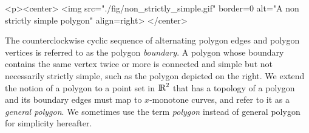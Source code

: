 \lcTex{%
  \setlength{\widthRight}{1.4cm}
  \setlength{\widthLeft}{\widthLineReal}
  \addtolength{\widthLeft}{-\widthRight}
  \begin{minipage}{\widthLeft}
}
\label{fig:non_strictly_simple_polygon}
\begin{ccHtmlOnly}
  <p><center>
    <img src="./fig/non_strictly_simple.gif" border=0 alt="A non strictly simple polygon" align=right>
  </center>
\end{ccHtmlOnly}
The counterclockwise cyclic sequence of alternating polygon edges and
polygon vertices is referred to as the polygon {\em boundary}.
A polygon whose boundary contains the same vertex twice or more is connected
and simple but not necessarily strictly simple, such as the polygon depicted
on the right.  We extend the notion of a polygon to a point set in ${\rm I\!\hspace{-0.025em} R}^2$
that has  a topology of a polygon and its boundary edges must map to
$x$-monotone curves, and refer to it as a {\em general polygon}. We
sometimes use the term {\em polygon} instead of general polygon for
simplicity hereafter.

